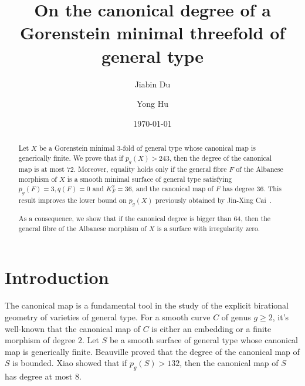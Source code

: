 \documentclass[11pt]{amsart}
\theoremstyle{plain}
\theoremstyle{definition}
\numberwithin{equation}{section}
\begin{document}
    \title[On the canonical degree of a threefold of general type]{On the canonical degree of a Gorenstein minimal threefold of general type}
	\author{Jiabin Du}
    \address{Shanghai Institute for Mathematics and Interdisciplinary Sciences (SIMIS)\\Shanghai
200433, China}
\address{Research Institute of Intelligent Complex Systems\\Fudan University\\Shanghai 200433, China}
    
    \author{Yong Hu}
    \address{ School of Mathematical Sciences \\Shanghai Jiao Tong University\\ Dongchuan  Road 800  \\ Shanghai 200240, China}
	
	\date{\today}
		\begin{abstract}
		Let $X$ be a Gorenstein minimal   $3$-fold of general type whose canonical map is generically finite. We prove that if  $p_g(X)> 243$, then the  degree of the canonical map is at most $72$. Moreover, equality holds  only if the general fibre $F$ of the Albanese morphism of $X$ is a smooth  minimal surface of general type satisfying $p_g(F)=3,q(F)=0$ and $K_F^2=36$, and the canonical map of $F$ has degree $36$. This result improves the lower bound on  $p_g(X)$ previously obtained by Jin-Xing Cai~\cite{Cai08}.  

        As a consequence, we show that if the canonical degree is bigger than $64$, then the general fibre of the Albanese morphism of $X$ is a surface with irregularity zero.
	\end{abstract}
\maketitle

\section{Introduction}

The canonical map is a fundamental tool in the study of the explicit birational geometry of varieties of general type. For a smooth  curve $C$ of genus $g\geq 2$, it's well-known that the canonical map of $C$ is either an  embedding or a finite morphism of degree $2$.  Let $S$ be a smooth  surface of general type whose canonical map is  generically finite.  Beauville \cite{Bea79} proved that the degree of the canonical map of $S$ is bounded.  Xiao \cite{Xia86} showed that if $p_g(S)>132$, then the canonical map of $S$ has degree at most $8$.
\end{document}
